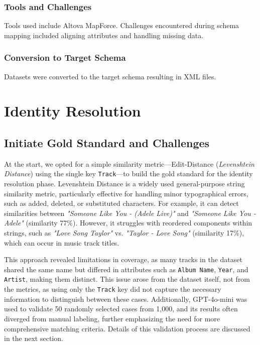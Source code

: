 \documentclass[runningheads]{llncs}
\begin{document}
\subsubsection{Tools and Challenges}
Tools used include Altova MapForce. Challenges encountered during schema mapping included aligning attributes and handling missing data.

\subsubsection{Conversion to Target Schema}
Datasets were converted to the target schema resulting in XML files.

\section{Identity Resolution}
\subsection{Initiate Gold Standard and Challenges}

At the start, we opted for a simple similarity metric---Edit-Distance (\textit{Levenshtein Distance}) using the single key \texttt{Track}---to build the gold standard for the identity resolution phase. Levenshtein Distance is a widely used general-purpose string similarity metric, particularly effective for handling minor typographical errors, such as added, deleted, or substituted characters. For example, it can detect similarities between \textit{"Someone Like You - (Adele Live)"} and \textit{"Someone Like You - Adele"} (similarity 77\%). However, it struggles with reordered components within strings, such as \textit{"Love Song Taylor"} vs. \textit{"Taylor - Love Song"} (similarity 17\%), which can occur in music track titles.

This approach revealed limitations in coverage, as many tracks in the dataset shared the same name but differed in attributes such as \texttt{Album Name}, \texttt{Year}, and \texttt{Artist}, making them distinct. This issue arose from the dataset itself, not from the metrics, as using only the \texttt{Track} key did not capture the necessary information to distinguish between these cases. Additionally, GPT-4o-mini was used to validate 50 randomly selected cases from 1,000, and its results often diverged from manual labeling, further emphasizing the need for more comprehensive matching criteria. Details of this validation process are discussed in the next section.
\end{document}
